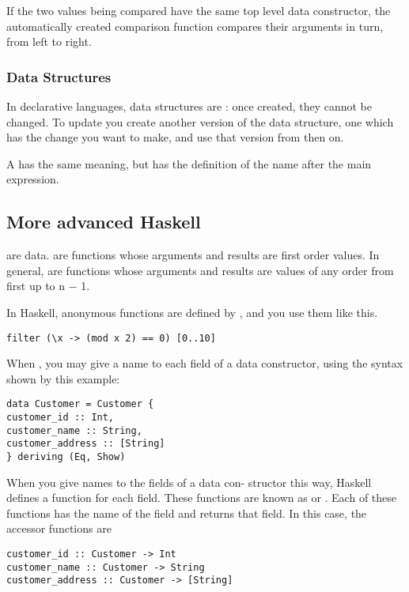 If the two values being compared have the same top
level data constructor, the automatically created
comparison function compares their arguments in
turn, from left to right.

\subsubsection{Data Structures}
In declarative languages, data structures are : once created, they cannot be changed. To update you create another version of the data structure,
one which has the change you want to make, and
use that version from then on.

A   has
the same meaning, but has the definition of the
name after the main expression.

\subsection{More advanced Haskell}
 are data.
 are functions whose arguments
and results are first order values.
In general,  are functions whose
arguments and results are values of any order from
first up to n − 1.

In Haskell, anonymous functions are defined by
, and you use them like this.
\begin{lstlisting}
filter (\x -> (mod x 2) == 0) [0..10]
\end{lstlisting}

When , you may
give a name to each field of a data constructor,
using the syntax shown by this example:
\begin{lstlisting}
data Customer = Customer {
customer_id :: Int,
customer_name :: String,
customer_address :: [String]
} deriving (Eq, Show)
\end{lstlisting}

When you give names to the fields of a data con-
structor this way, Haskell defines a function for each
field. These functions are known as  or
. Each of these functions
has the name of the field and returns that field. In
this case, the accessor functions are
\begin{lstlisting}
customer_id :: Customer -> Int
customer_name :: Customer -> String
customer_address :: Customer -> [String]
\end{lstlisting}



